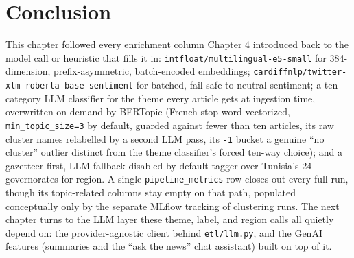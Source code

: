 \section{Conclusion}
\begin{sloppypar}
This chapter followed every enrichment column Chapter 4 introduced back to the model call or heuristic that fills it in: \texttt{intfloat/\allowbreak multilingual-e5-small} for 384-dimension, prefix-asymmetric, batch-encoded embeddings; \texttt{cardiffnlp/\allowbreak twitter-xlm-roberta-\allowbreak base-sentiment} for batched, fail-safe-to-neutral sentiment; a ten-category LLM classifier for the theme every article gets at ingestion time, overwritten on demand by BERTopic (French-stop-word vectorized, \texttt{min\_topic\_size=3} by default, guarded against fewer than ten articles, its raw cluster names relabelled by a second LLM pass, its \texttt{-1} bucket a genuine ``no cluster'' outlier distinct from the theme classifier's forced ten-way choice); and a gazetteer-first, LLM-fallback-disabled-by-default tagger over Tunisia's 24 governorates for region. A single \texttt{pipeline\_metrics} row closes out every full run, though its topic-related columns stay empty on that path, populated conceptually only by the separate MLflow tracking of clustering runs. The next chapter turns to the LLM layer these theme, label, and region calls all quietly depend on: the provider-agnostic client behind \texttt{etl/llm.py}, and the GenAI features (summaries and the ``ask the news'' chat assistant) built on top of it.
\end{sloppypar}
